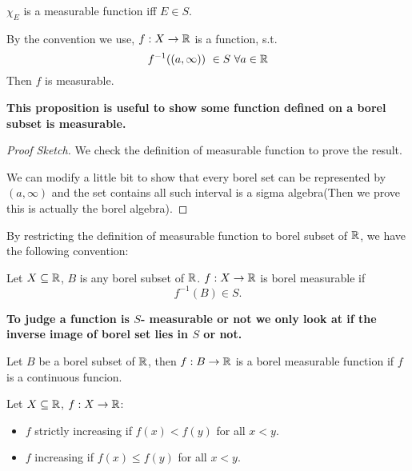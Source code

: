 \documentclass[11pt]{article}
\begin{document}
\begin{proposition}[ ]
\(\chi_E\) is a measurable function iff \(E \in S\).
\end{proposition}

\begin{proposition}
By the convention we use, \(f:X \to \mathbb{R}\) is a function, s.t.
\[
f^{-1} ((a,\infty)) \ \in S \ \forall a \in \mathbb{R}
\]
Then \(f\) is measurable.
\end{proposition}

\textbf{This proposition is useful to show some function defined on a borel subset is measurable.}

\begin{proof}[Proof Sketch]
\leavevmode

We check the definition of measurable function to prove the result.

We can modify a little bit to show that every borel set can be represented by \((a,\infty)\) and the set contains all such interval is a sigma algebra(Then we prove this is actually the borel algebra).
\end{proof}

By restricting the definition of measurable function to borel subset of \(\mathbb{R}\), we have the following convention:

\begin{definition}
Let \(X \subseteq \mathbb{R}\), \(B\) is any borel subset of \(\mathbb{R}\). \(f:X \to \mathbb{R}\) is borel measurable if
\[
f^{-1}(B) \in S.
\]
\end{definition}

\textbf{To judge a function is \(S\)- measurable or not we only look at if the inverse image of borel set lies in \(S\) or not.}

\begin{proposition}
Let \(B\) be a borel subset of \(\mathbb{R}\), then \(f:B \to \mathbb{R}\) is a borel measurable function if \(f\) is a continuous funcion.
\end{proposition}

\begin{definition}
Let \(X \subseteq \mathbb{R}\), \(f:X \to \mathbb{R}\):
\begin{itemize}
\item \(f\) strictly increasing if \(f(x) < f(y)\) for all \(x < y\).
\item \(f\) increasing if \(f(x) \leq f(y)\) for all \(x < y\).
\end{itemize}
\end{definition}
\end{document}
